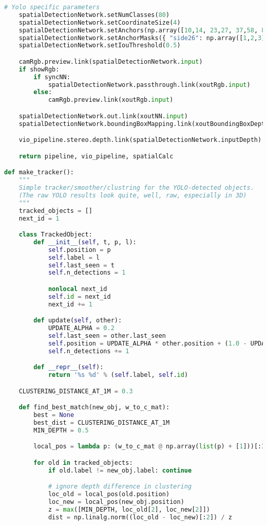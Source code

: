 \begin{lstlisting}[language=python,frame=single]
    # Yolo specific parameters
    spatialDetectionNetwork.setNumClasses(80)
    spatialDetectionNetwork.setCoordinateSize(4)
    spatialDetectionNetwork.setAnchors(np.array([10,14, 23,27, 37,58, 81,82, 135,169, 344,319]))
    spatialDetectionNetwork.setAnchorMasks({ "side26": np.array([1,2,3]), "side13": np.array([3,4,5]) })
    spatialDetectionNetwork.setIouThreshold(0.5)

    camRgb.preview.link(spatialDetectionNetwork.input)
    if showRgb:
        if syncNN:
            spatialDetectionNetwork.passthrough.link(xoutRgb.input)
        else:
            camRgb.preview.link(xoutRgb.input)

    spatialDetectionNetwork.out.link(xoutNN.input)
    spatialDetectionNetwork.boundingBoxMapping.link(xoutBoundingBoxDepthMapping.input)

    vio_pipeline.stereo.depth.link(spatialDetectionNetwork.inputDepth)

    return pipeline, vio_pipeline, spatialCalc

def make_tracker():
    """
    Simple tracker/smoother/clustring for the YOLO-detected objects.
    (The raw YOLO results look quite, well, raw, especially in 3D)
    """
    tracked_objects = []
    next_id = 1

    class TrackedObject:
        def __init__(self, t, p, l):
            self.position = p
            self.label = l
            self.last_seen = t
            self.n_detections = 1

            nonlocal next_id
            self.id = next_id
            next_id += 1

        def update(self, other):
            UPDATE_ALPHA = 0.2
            self.last_seen = other.last_seen
            self.position = UPDATE_ALPHA * other.position + (1.0 - UPDATE_ALPHA) * self.position
            self.n_detections += 1

        def __repr__(self):
            return '%s %d' % (self.label, self.id)

    CLUSTERING_DISTANCE_AT_1M = 0.3

    def find_best_match(new_obj, w_to_c_mat):
        best = None
        best_dist = CLUSTERING_DISTANCE_AT_1M
        MIN_DEPTH = 0.5

        local_pos = lambda p: (w_to_c_mat @ np.array(list(p) + [1]))[:3]

        for old in tracked_objects:
            if old.label != new_obj.label: continue

            # ignore depth difference in clustering
            loc_old = local_pos(old.position)
            loc_new = local_pos(new_obj.position)
            z = max([MIN_DEPTH, loc_old[2], loc_new[2]])
            dist = np.linalg.norm((loc_old - loc_new)[:2]) / z


\end{lstlisting}
